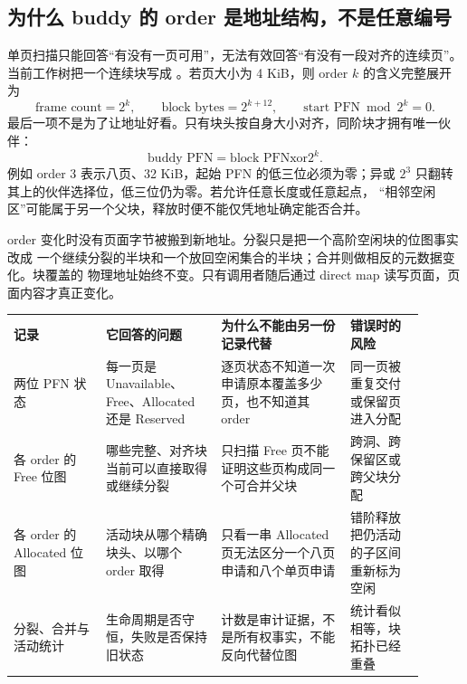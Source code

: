 \subsection{为什么 buddy 的 order 是地址结构，不是任意编号}

单页扫描只能回答“有没有一页可用”，无法有效回答“有没有一段对齐的连续页”。
当前工作树把一个连续块写成 。若页大小为 4 KiB，则 order \(k\) 的含义完整展开为
\[
  \text{frame count}=2^k,\qquad
  \text{block bytes}=2^{k+12},\qquad
  \text{start PFN}\bmod 2^k=0.
\]
最后一项不是为了让地址好看。只有块头按自身大小对齐，同阶块才拥有唯一伙伴：
\[
  \text{buddy PFN}=\text{block PFN}\mathbin{\mathrm{xor}}2^k.
\]
例如 order 3 表示八页、32 KiB，起始 PFN 的低三位必须为零；异或
\(2^3\) 只翻转其上的伙伴选择位，低三位仍为零。若允许任意长度或任意起点，
“相邻空闲区”可能属于另一个父块，释放时便不能仅凭地址确定能否合并。

order 变化时没有页面字节被搬到新地址。分裂只是把一个高阶空闲块的位图事实改成
一个继续分裂的半块和一个放回空闲集合的半块；合并则做相反的元数据变化。块覆盖的
物理地址始终不变。只有调用者随后通过 direct map 读写页面，页面内容才真正变化。

\begin{longtable}{|L{0.20\linewidth}|L{0.25\linewidth}|L{0.29\linewidth}|L{0.16\linewidth}|}
\hline
{}
\textbf{记录} & \textbf{它回答的问题} & \textbf{为什么不能由另一份记录代替} &
\textbf{错误时的风险} \\\tablerowrule
\endhead
两位 PFN 状态 & 每一页是 Unavailable、Free、Allocated 还是 Reserved &
逐页状态不知道一次申请原本覆盖多少页，也不知道其 order &
同一页被重复交付或保留页进入分配 \\\tablerowrule
各 order 的 Free 位图 & 哪些完整、对齐块当前可以直接取得或继续分裂 &
只扫描 Free 页不能证明这些页构成同一个可合并父块 &
跨洞、跨保留区或跨父块分配 \\\tablerowrule
各 order 的 Allocated 位图 & 活动块从哪个精确块头、以哪个 order 取得 &
只看一串 Allocated 页无法区分一个八页申请和八个单页申请 &
错阶释放把仍活动的子区间重新标为空闲 \\\tablerowrule
分裂、合并与活动统计 & 生命周期是否守恒，失败是否保持旧状态 &
计数是审计证据，不是所有权事实，不能反向代替位图 &
统计看似相等，块拓扑已经重叠 \\\hline
\end{longtable}

